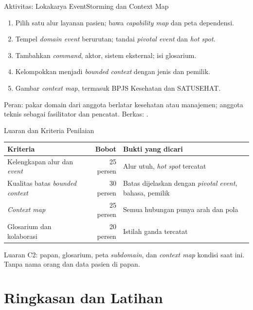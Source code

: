 \documentclass[aspectratio=169, table, 12pt]{beamer}
\begin{document}
\begin{frame}{{\Large Aktivitas: Lokakarya EventStorming dan Context Map}}
  \small
  \begin{enumerate}
    \item Pilih satu alur layanan pasien; bawa \textit{capability map} dan peta
          dependensi.
    \item Tempel \textit{domain event} berurutan; tandai \textit{pivotal event} dan
          \textit{hot spot}.
    \item Tambahkan \textit{command}, aktor, sistem eksternal; isi glosarium.
    \item Kelompokkan menjadi \textit{bounded context} dengan jenis dan pemilik.
    \item Gambar \textit{context map}, termasuk BPJS Kesehatan dan SATUSEHAT.
  \end{enumerate}
  \vspace{4pt}
  \footnotesize
  Peran: pakar domain dari anggota berlatar kesehatan atau manajemen; anggota
  teknis sebagai fasilitator dan pencatat. Berkas: .
\end{frame}

\begin{frame}{{\Large Luaran dan Kriteria Penilaian}}
  \footnotesize
  \begin{tabularx}{\textwidth}{>{\raggedright\arraybackslash}X r
      >{\raggedright\arraybackslash}X}
    \hline
    \textbf{Kriteria} & \textbf{Bobot} & \textbf{Bukti yang dicari} \\
    \hline
    Kelengkapan alur dan \textit{event} & 25 persen & Alur utuh, \textit{hot spot}
      tercatat \\
    \hline
    Kualitas batas \textit{bounded context} & 30 persen & Batas dijelaskan dengan
      \textit{pivotal event}, bahasa, pemilik \\
    \hline
    \textit{Context map} & 25 persen & Semua hubungan punya arah dan pola \\
    \hline
    Glosarium dan kolaborasi & 20 persen & Istilah ganda tercatat \\
    \hline
  \end{tabularx}

  \vspace{10pt}
  \small
  Luaran C2: papan, glosarium, peta \textit{subdomain}, dan \textit{context map}
  kondisi saat ini. Tanpa nama orang dan data pasien di papan.
\end{frame}

\section{Ringkasan dan Latihan}
\end{document}
